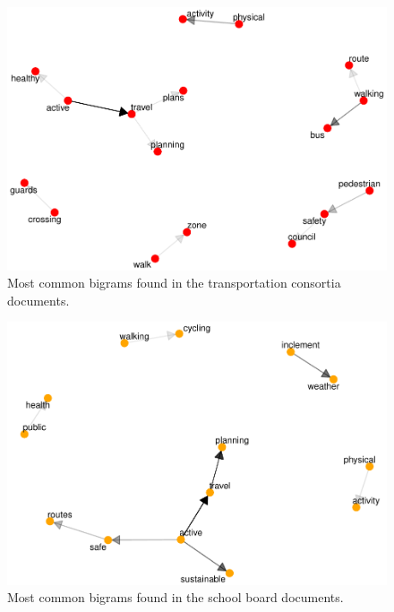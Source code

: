\documentclass[]{elsarticle} %
\begin{document}
\begin{figure}

{\centering \includegraphics[width=1\linewidth]{AST-Framing-Ontario_files/figure-latex/consortia-visual-1} 

}

\caption{Most common bigrams found in the transportation consortia documents.}\label{fig:consortia-visual}
\end{figure}

\begin{figure}

{\centering \includegraphics[width=1\linewidth]{AST-Framing-Ontario_files/figure-latex/school-visual-1} 

}

\caption{Most common bigrams found in the school board documents.}\label{fig:school-visual}
\end{figure}
\end{document}

